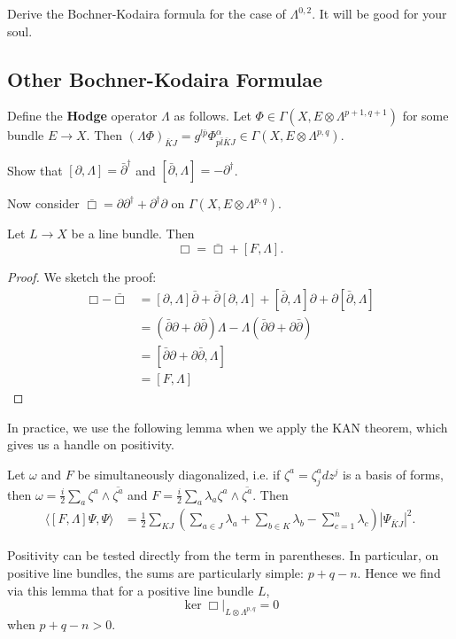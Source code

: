 \documentclass{../mathnotes}
\begin{document}
\begin{exc}
    Derive the Bochner-Kodaira formula for the case of $\Lambda^{0,2}$. It will be good for your soul.
\end{exc}

\subsection{Other Bochner-Kodaira Formulae}

\begin{defn}
    Define the \textbf{Hodge} operator $\Lambda$ as follows.
    Let $\Phi\in\Gamma(X,E\otimes\Lambda^{p+1,q+1})$ for some
    bundle $E\to X$. Then $(\Lambda\Phi)_{\bar KJ}=g^{l\bar p}\Phi^\alpha_{p\bar l\bar KJ}\in\Gamma(X,E\otimes\Lambda^{p,q})$.
\end{defn}

\begin{exc}
    Show that $[\partial,\Lambda]=\bar\partial^\dagger$ and $[\bar\partial,\Lambda]=-\partial^\dagger$.
\end{exc}

Now consider $\bar\Box=\partial\partial^\dagger+\partial^\dagger\partial$ on $\Gamma(X,E\otimes\Lambda^{p,q})$.
\begin{thm}
    Let $L\to X$ be a line bundle. Then
    \[\Box=\bar\Box+[F,\Lambda].\]
\end{thm}
\begin{proof}
    We sketch the proof: 
    \begin{align*}
        \Box-\bar\Box&=[\partial,\Lambda]\bar\partial+\bar\partial[\partial,\Lambda]+[\bar\partial,\Lambda]\partial+\partial[\bar\partial,\Lambda]\\
        &=(\bar\partial\partial+\partial\bar\partial)\Lambda-\Lambda(\bar\partial\partial+\partial\bar\partial)\\
        &=[\bar\partial\partial+\partial\bar\partial,\Lambda]\\
        &=[F,\Lambda]
    \end{align*}
\end{proof}

In practice, we use the following lemma when we apply the KAN theorem, which gives us a handle on positivity.
\begin{lem}
    Let $\omega$ and $F$ be simultaneously diagonalized, i.e. if $\zeta^a=\zeta^a_j dz^j$ is a basis of forms, then
    $\omega=\frac{i}{2}\sum_a\zeta^a\wedge\overline{\zeta^a}$ and $F=\frac{i}{2}\sum_a\lambda_a\zeta^a\wedge\overline{\zeta^a}$.
    Then
    \begin{align*}
        \langle[F,\Lambda]\Psi,\Psi\rangle&=\frac{1}{2}\sum_{KJ}\left(\sum_{a\in J}\lambda_a+\sum_{b\in K}\lambda_b-\sum_{c=1}^n\lambda_c\right)|\Psi_{\bar KJ}|^2.
    \end{align*}
\end{lem}
Positivity can be tested directly from the term in parentheses. In particular, on positive line bundles, the sums are particularly simple: $p+q-n$.
Hence we find via this lemma that for a positive line bundle $L$,
\[\ker\Box\bigg|_{L\otimes\Lambda^{p,q}}=0\]
when $p+q-n>0$.
\end{document}
